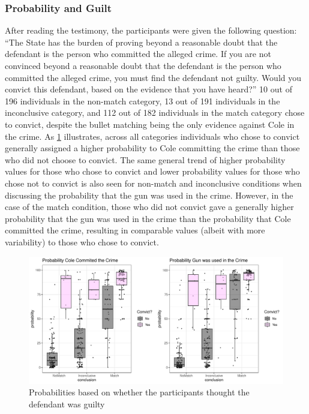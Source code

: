 \documentclass[print]{nuthesis}
\begin{document}
\hypertarget{probability-and-guilt}{%
\subsubsection{Probability and Guilt}\label{probability-and-guilt}}

After reading the testimony, the participants were given the following question:
``The State has the burden of proving beyond a reasonable doubt that the defendant is the person who committed the alleged crime.
If you are not convinced beyond a reasonable doubt that the defendant is the person who committed the alleged crime, you must find the defendant not guilty.
Would you convict this defendant, based on the evidence that you have heard?''
10 out of 196 individuals in the non-match category, 13 out of 191 individuals in the inconclusive category, and 112 out of 182 individuals in the match category chose to convict, despite the bullet matching being the only evidence against Cole in the crime.
As \ref{fig:probguilt} illustrates, across all categories individuals who chose to convict generally assigned a higher probability to Cole committing the crime than those who did not choose to convict.
The same general trend of higher probability values for those who chose to convict and lower probability values for those who chose not to convict is also seen for non-match and inconclusive conditions when discussing the probability that the gun was used in the crime.
However, in the case of the match condition, those who did not convict gave a generally higher probability that the gun was used in the crime than the probability that Cole committed the crime, resulting in comparable values (albeit with more variability) to those who chose to convict.

\begin{figure}

{\centering \includegraphics[width=\linewidth]{thesis_files/figure-latex/probguilt-1} 

}

\caption{Probabilities based on whether the participants thought the defendant was guilty}\label{fig:probguilt}
\end{figure}
\end{document}
